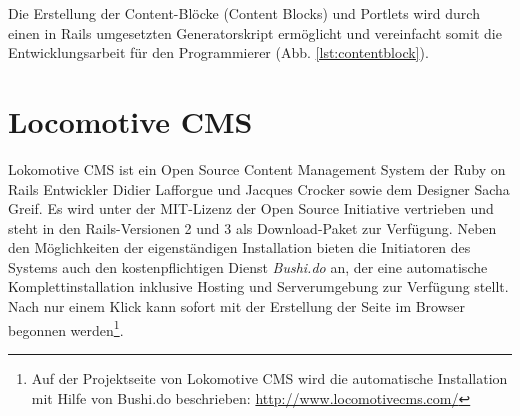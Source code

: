 Die Erstellung der Content-Blöcke (Content Blocks) und Portlets wird durch einen in Rails umgesetzten Generatorskript ermöglicht und vereinfacht somit die Entwicklungsarbeit für den Programmierer (Abb. \ref{lst:contentblock}).

\newpage
\section{Locomotive CMS}
Lokomotive CMS ist ein Open Source Content Management System der Ruby on Rails Entwickler Didier Lafforgue und Jacques Crocker sowie dem Designer Sacha Greif. Es wird unter der MIT-Lizenz der Open Source Initiative vertrieben und steht in den Rails-Versionen 2 und 3 als Download-Paket zur Verfügung. Neben den Möglichkeiten der eigenständigen Installation bieten die Initiatoren des Systems auch den kostenpflichtigen Dienst \emph{Bushi.do} an, der eine automatische Komplettinstallation inklusive Hosting und Serverumgebung zur Verfügung stellt. Nach nur einem Klick kann sofort mit der Erstellung der Seite im Browser begonnen werden\footnote{Auf der Projektseite von Lokomotive CMS wird die automatische Installation mit Hilfe von Bushi.do beschrieben: \href{http://www.locomotivecms.com/}{http://www.locomotivecms.com/}}.
